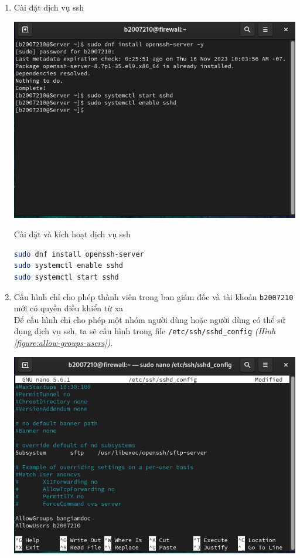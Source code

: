 \documentclass[a4paper, 11pt]{article}
\begin{document}
\begin{enumerate}
    \item Cài đặt dịch vụ ssh \hfill \\
          \begin{minipage}
              {\linewidth}
              \captionsetup{type=figure}
              \centering
              \includegraphics[width=\linewidth]{images/install-ssh.png}
              \caption{Cài đặt và kích hoạt dịch vụ ssh}
              \label{figure:install-ssh}
          \end{minipage}
          \begin{lstlisting}[language=bash, caption=Cài đặt và kích hoạt dịch vụ ssh]
sudo dnf install openssh-server
sudo systemctl enable sshd
sudo systemctl start sshd
\end{lstlisting}
    \item Cấu hình chỉ cho phép thành viên trong ban giám đốc và tài khoản \texttt{b2007210} mới có quyền điều khiển từ xa \hfill \\
          Để cấu hình chỉ cho phép một nhóm người dùng hoặc người dùng có thể sử dụng dịch vụ ssh, ta sẽ cấu hình trong file \texttt{/etc/ssh/sshd\_config} \textit{(Hình \ref{figure:allow-groups-users})}. \\
          \begin{minipage}
              {\linewidth}
              \captionsetup{type=figure}
              \centering
              \includegraphics[width=\linewidth]{images/allow-groups-users.png}

\end{minipage}
\end{enumerate}
\end{document}
